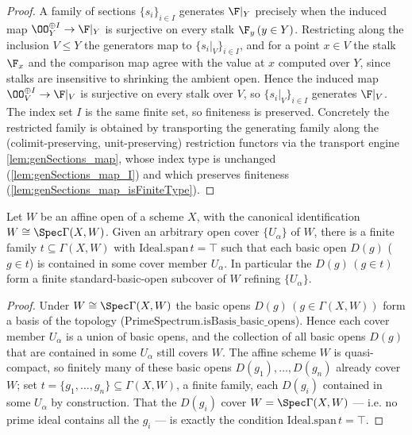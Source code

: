 \begin{proof}
  \leanok
  A family of sections \(\{s_i\}_{i \in I}\) generates \(\F|_Y\) precisely when the
  induced map \(\OO_Y^{\oplus I} \to \F|_Y\) is surjective on every stalk
  \(\F_y\,(y \in Y)\). Restricting along the inclusion \(V \le Y\) the
  generators map to \(\{s_i|_V\}_{i \in I}\), and for a point \(x \in V\) the stalk
  \(\F_x\) and the comparison map agree with the value at \(x\) computed over \(Y\), since
  stalks are insensitive to shrinking the ambient open. Hence the induced map
  \(\OO_V^{\oplus I} \to \F|_V\) is surjective on every stalk over \(V\), so
  \(\{s_i|_V\}_{i \in I}\) generates \(\F|_V\). The index set \(I\) is the same
  finite set, so finiteness is preserved. Concretely the restricted family is obtained by
  transporting the generating family along the (colimit-preserving, unit-preserving)
  restriction functors via the transport engine \cref{lem:genSections_map}, whose index
  type is unchanged (\cref{lem:genSections_map_I}) and which preserves finiteness
  (\cref{lem:genSections_map_isFiniteType}).
\end{proof}

\begin{lemma}
  \label{lem:gf_affine_finite_standard_subcover}
  Let \(W\) be an affine open of a scheme \(X\), with the canonical identification
  \(W \cong \Spec \Gamma(X, W)\). Given an arbitrary open cover \(\{U_\alpha\}\) of \(W\),
  there is a finite family \(t \subseteq \Gamma(X, W)\) with
  \(\mathrm{Ideal.span}\,t = \top\) such that each basic open \(D(g)\) (\(g \in t\)) is
  contained in some cover member \(U_\alpha\). In particular the \(D(g)\,(g \in t)\) form a
  finite standard-basic-open subcover of \(W\) refining \(\{U_\alpha\}\).
\end{lemma}

\begin{proof}

\leanok
  Under \(W \cong \Spec \Gamma(X, W)\) the basic opens \(D(g)\,(g \in \Gamma(X, W))\) form a
  basis of the topology (\(\mathrm{PrimeSpectrum.isBasis\_basic\_opens}\)). Hence each
  cover member \(U_\alpha\) is a union of basic opens, and the collection of all basic
  opens \(D(g)\) that are contained in some \(U_\alpha\) still covers \(W\). The affine
  scheme \(W\) is quasi-compact, so finitely many of these basic opens
  \(D(g_1), \dots, D(g_n)\) already cover \(W\); set
  \(t = \{g_1, \dots, g_n\} \subseteq \Gamma(X, W)\), a finite family, each \(D(g_i)\)
  contained in some \(U_\alpha\) by construction. That the \(D(g_i)\) cover
  \(W = \Spec \Gamma(X, W)\) — i.e. no prime ideal contains all the \(g_i\) — is exactly
  the condition \(\mathrm{Ideal.span}\,t = \top\).
\end{proof}


